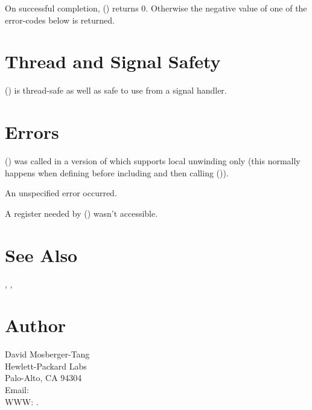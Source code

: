 \documentclass{article}
\begin{document}
On successful completion, () returns 0.
Otherwise the negative value of one of the error-codes below is
returned.

\section{Thread and Signal Safety}

() is thread-safe as well as safe to use from a
signal handler.

\section{Errors}

\begin{Description}
\item[\Const{UNW\_EINVAL}] () was called in a
  version of  which supports local unwinding only
  (this normally happens when defining  before
  including  and then calling
  ()).
\item[\Const{UNW\_EUNSPEC}] An unspecified error occurred.
\item[\Const{UNW\_EBADREG}] A register needed by ()
  wasn't accessible.
\end{Description}

\section{See Also}

, ,

\section{Author}

\noindent
David Mosberger-Tang\\
Hewlett-Packard Labs\\
Palo-Alto, CA 94304\\
Email: \\
WWW: .
\LatexManEnd
\end{document}

